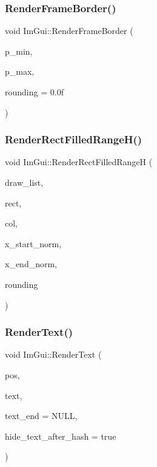 \subsubsection{\texorpdfstring{Render\+Frame\+Border()}{RenderFrameBorder()}}
{\footnotesize\ttfamily void Im\+Gui\+::\+Render\+Frame\+Border (\begin{DoxyParamCaption}\item[{\mbox{\hyperlink{struct_im_vec2}{Im\+Vec2}}}]{p\+\_\+min,  }\item[{\mbox{\hyperlink{struct_im_vec2}{Im\+Vec2}}}]{p\+\_\+max,  }\item[{float}]{rounding = {\ttfamily 0.0f} }\end{DoxyParamCaption})}

\mbox{\label{namespace_im_gui_af311762331bda4508b25e05f6afc7f45}} 
\subsubsection{\texorpdfstring{Render\+Rect\+Filled\+Range\+H()}{RenderRectFilledRangeH()}}
{\footnotesize\ttfamily void Im\+Gui\+::\+Render\+Rect\+Filled\+RangeH (\begin{DoxyParamCaption}\item[{\mbox{\hyperlink{struct_im_draw_list}{Im\+Draw\+List}} $\ast$}]{draw\+\_\+list,  }\item[{const \mbox{\hyperlink{struct_im_rect}{Im\+Rect}} \&}]{rect,  }\item[{\mbox{\hyperlink{imgui_8h_a118cff4eeb8d00e7d07ce3d6460eed36}{Im\+U32}}}]{col,  }\item[{float}]{x\+\_\+start\+\_\+norm,  }\item[{float}]{x\+\_\+end\+\_\+norm,  }\item[{float}]{rounding }\end{DoxyParamCaption})}

\mbox{\label{namespace_im_gui_a9971ce57f2a288ac3a12df886c5550d1}} 
\subsubsection{\texorpdfstring{Render\+Text()}{RenderText()}}
{\footnotesize\ttfamily void Im\+Gui\+::\+Render\+Text (\begin{DoxyParamCaption}\item[{\mbox{\hyperlink{struct_im_vec2}{Im\+Vec2}}}]{pos,  }\item[{const char $\ast$}]{text,  }\item[{const char $\ast$}]{text\+\_\+end = {\ttfamily NULL},  }\item[{bool}]{hide\+\_\+text\+\_\+after\+\_\+hash = {\ttfamily true} }\end{DoxyParamCaption})}

